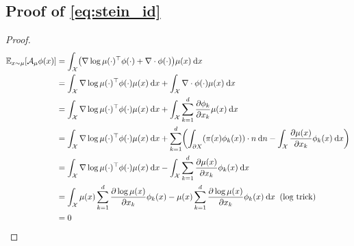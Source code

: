 \documentclass[runningheads,a4paper]{llncs}
\newcommand{\E}{\mathbb{E}}
\newcommand{\X}{\mathcal{X}}
\newcommand{\A}{\mathcal{A}}
\newcommand{\diff}[2]{\frac{\partial #1}{\partial #2}}
\renewcommand{\d}{\: \mathrm{d}}
\DeclarePairedDelimiter{\pare}{(}{)}
\begin{document}
\subsection{Proof of \ref{eq:stein_id}}
\begin{proof}\label{proof:stein_id}
  \begin{align*}
    \E_{x \sim \mu}[\A_\mu \phi (x)] &=
      \int_\X \pare*{ \nabla \log \mu(\cdot)^\top \phi(\cdot) + \nabla \cdot \phi(\cdot) } \mu(x) \d x \\
    &= \int_\X \nabla \log \mu(\cdot)^\top \phi(\cdot) \mu(x) \d x + \int_\X \nabla \cdot \phi(\cdot) \mu(x) \d x \\
    &= \int_\X \nabla \log \mu(\cdot)^\top \phi(\cdot) \mu(x) \d x +
      \int_\X \sum_{k=1}^d \diff{\phi_k}{x_k} \mu(x) \d x \\
    &= \int_\X \nabla \log \mu(\cdot)^\top \phi(\cdot) \mu(x) \d x +
    \sum_{k=1}^d \pare*{\int_{\partial X}\pare*{\pi(x) \phi_k(x)} \cdot n \d n - \int_\X \diff{\mu(x)}{x_k} \phi_k(x) \d x} \\
    &= \int_\X \nabla \log \mu(\cdot)^\top \phi(\cdot) \mu(x) \d x -
      \int_\X \sum_{k=1}^d \diff{\mu(x)}{x_k} \phi_k(x) \d x \\
    &= \int_\X  \mu(x) \sum_{k=1}^d \diff{\log \mu(x)}{x_k}\phi_k(x) -
    \mu(x) \sum_{k=1}^d \diff{\log \mu(x)}{x_k} \phi_k(x) \d x \;\; \text{(log trick)} \\
    &= 0
  \end{align*}
\end{proof}
\end{document}

